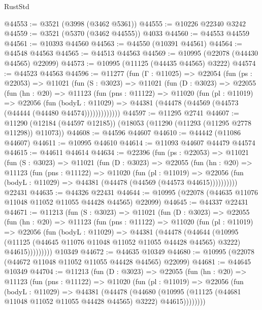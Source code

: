\begin{lexlean}{RustStd}
\begin{coremodule}
@44553 := @3521 (@3998 (@3462 @5361))
@44555 := @10226 @22340 @3242
@44559 := @3521 (@5370 (@3462 @44555)) @4033
@44560 := @44553 @44559
@44561 := @10393 @44560
@44563 := @44550 (@10391 @44561)
@44564 := @44548 @44563
@44565 := @44513 @44563
@44569 := @10995 (@22078 (@44430 @44565) @22099)
@44573 := @10995 (@11125 (@44435 @44565) @3222)
@44574 := @44523 @44563
@44596 := @11277
    (fun (Γ : @11025) =>
    @22054
      (fun (ps : @22053) =>
      @11021
        (fun (S : @3023) =>
        @11021
          (fun (D : @3023) =>
          @22055
            (fun (hn : @20) =>
            @11123
              (fun (pns : @11122) =>
              @11020
                (fun (pl : @11019) =>
                @22056
                  (fun (bodyL : @11029) =>
                  @44381 (@44478 (@44569 (@44573 (@44444 (@44480 @44574)))))))))))))
@44597 := @11295 @2741
@44607 := @11290 (@12184 (@44597 @12185)) (@18053 (@11290 (@11293 (@11295 @2778 @11298)) @11073))
@44608 := @44596 @44607
@44610 := @44442 (@11086 @44607)
@44611 := @10995 @44610
@44614 := @11093 @44607 @44479 @44574
@44615 := @44611 @44614
@44634 := @22396
    (fun (ps : @22053) =>
    @11021
      (fun (S : @3023) =>
      @11021
        (fun (D : @3023) =>
        @22055
          (fun (hn : @20) =>
          @11123
            (fun (pns : @11122) =>
            @11020
              (fun (pl : @11019) =>
              @22056 (fun (bodyL : @11029) => @44381 (@44478 (@44569 (@44573 @44615))))))))))
    @22431
@44635 := @44326 @22431
@44644 := @10995 (@22078 (@44635 @11076 @11048 @11052 @11055 @44428 @44565) @22099)
@44645 := @44337 @22431
@44671 := @11213
    (fun (S : @3023) =>
    @11021
      (fun (D : @3023) =>
      @22055
        (fun (hn : @20) =>
        @11123
          (fun (pns : @11122) =>
          @11020
            (fun (pl : @11019) =>
            @22056
              (fun (bodyL : @11029) =>
              @44381
                (@44478
                  (@44644
                    (@10995
                      (@11125 (@44645 @11076 @11048 @11052 @11055 @44428 @44565) @3222)
                      @44615)))))))))
    @10349
@44672 := @44635 @10349
@44680 := @10995 (@22078 (@44672 @11048 @11052 @11055 @44428 @44565) @22099)
@44681 := @44645 @10349
@44704 := @11213
    (fun (D : @3023) =>
    @22055
      (fun (hn : @20) =>
      @11123
        (fun (pns : @11122) =>
        @11020
          (fun (pl : @11019) =>
          @22056
            (fun (bodyL : @11029) =>
            @44381
              (@44478
                (@44680
                  (@10995 (@11125 (@44681 @11048 @11052 @11055 @44428 @44565) @3222) @44615))))))))

\end{coremodule}
\end{lexlean}
